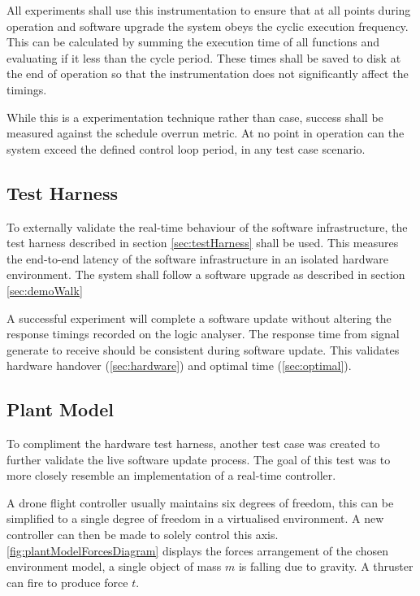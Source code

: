 All experiments shall use this instrumentation to ensure that at all points during operation and software upgrade the system obeys the cyclic execution frequency. This can be calculated by summing the execution time of all functions and evaluating if it less than the cycle period. These times shall be saved to disk at the end of operation so that the instrumentation does not significantly affect the timings.

While this is a experimentation technique rather than case, success shall be measured against the schedule overrun metric. At no point in operation can the system exceed the defined control loop period, in any test case scenario.

\subsection{Test Harness}

To externally validate the real-time behaviour of the software infrastructure, the test harness described in section \ref{sec:testHarness} shall be used. This measures the end-to-end latency of the software infrastructure in an isolated hardware environment. The system shall follow a software upgrade as described in section \ref{sec:demoWalk}

A successful experiment will complete a software update without altering the response timings recorded on the logic analyser. The response time from signal generate to receive should be consistent during software update. This validates hardware handover (\ref{sec:hardware}) and optimal time (\ref{sec:optimal}).

\clearpage

\subsection{Plant Model}

To compliment the hardware test harness, another test case was created to further validate the live software update process. The goal of this test was to more closely resemble an implementation of a real-time controller.

A drone flight controller usually maintains six degrees of freedom, this can be simplified to a single degree of freedom in a virtualised environment. A new controller can then be made to solely control this axis. \autoref{fig:plantModelForcesDiagram} displays the forces arrangement of the chosen environment model, a single object of mass $m$ is falling due to gravity. A thruster can fire to produce force $t$.

